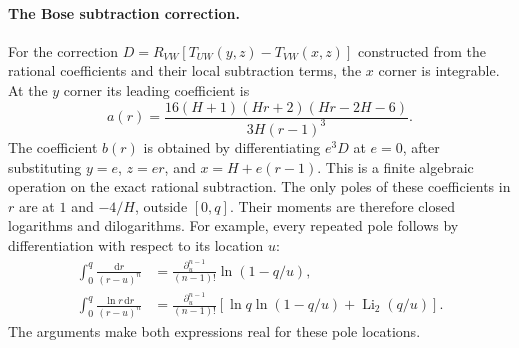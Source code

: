 \paragraph{The Bose subtraction correction.}
For the correction $D=R_{VW}[T_{UW}(y,z)-T_{VW}(x,z)]$ constructed from the
rational coefficients and their local subtraction terms, the $x$ corner
is integrable.  At the $y$ corner its leading coefficient is
\begin{equation}
 a(r)=\frac{16(H+1)(Hr+2)(Hr-2H-6)}{3H(r-1)^3}.
\end{equation}
The coefficient $b(r)$ is obtained by differentiating $e^3D$ at $e=0$,
after substituting $y=e$, $z=er$, and $x=H+e(r-1)$.
This is a finite algebraic operation on the exact rational subtraction.
The only poles of these coefficients in $r$ are at $1$ and $-4/H$,
outside $[0,q]$.  Their moments are therefore closed logarithms and
dilogarithms.  For example, every repeated pole follows by differentiation
with respect to its location $u$:
\begin{align}
 \int_0^q\frac{\mathrm{d}r}{(r-u)^n}
 &=\frac{\partial_u^{n-1}}{(n-1)!}\ln(1-q/u),\\
 \int_0^q\frac{\ln r\,\mathrm{d}r}{(r-u)^n}
 &=\frac{\partial_u^{n-1}}{(n-1)!}
 \left[\ln q\ln(1-q/u)+\operatorname{Li}_2(q/u)\right].
\end{align}
The arguments make both expressions real for these pole locations.
